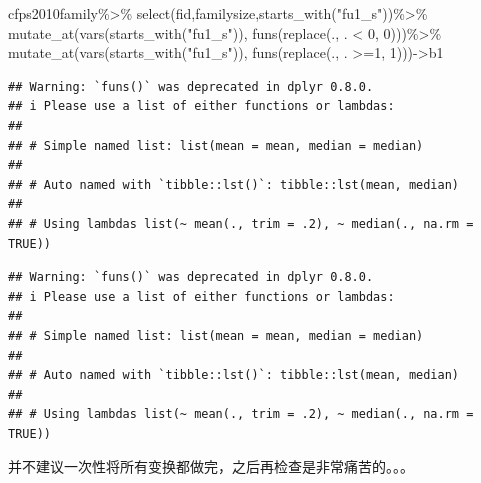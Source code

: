 \documentclass[
  oneside]{book}
\newenvironment{Shaded}{\begin{snugshade}}{\end{snugshade}}
\newcommand{\AttributeTok}[1]{\textcolor[rgb]{0.77,0.63,0.00}{#1}}
\newcommand{\CommentTok}[1]{\textcolor[rgb]{0.56,0.35,0.01}{\textit{#1}}}
\newcommand{\DecValTok}[1]{\textcolor[rgb]{0.00,0.00,0.81}{#1}}
\newcommand{\FunctionTok}[1]{\textcolor[rgb]{0.00,0.00,0.00}{#1}}
\newcommand{\NormalTok}[1]{#1}
\newcommand{\OtherTok}[1]{\textcolor[rgb]{0.56,0.35,0.01}{#1}}
\newcommand{\SpecialCharTok}[1]{\textcolor[rgb]{0.00,0.00,0.00}{#1}}
\newcommand{\StringTok}[1]{\textcolor[rgb]{0.31,0.60,0.02}{#1}}
\begin{document}
\begin{Shaded}
\begin{Highlighting}[]
\NormalTok{cfps2010family}\SpecialCharTok{\%\textgreater{}\%}
  \FunctionTok{select}\NormalTok{(fid,familysize,}\FunctionTok{starts\_with}\NormalTok{(}\StringTok{"fu1\_s"}\NormalTok{))}\SpecialCharTok{\%\textgreater{}\%}
  \FunctionTok{mutate\_at}\NormalTok{(}\FunctionTok{vars}\NormalTok{(}\FunctionTok{starts\_with}\NormalTok{(}\StringTok{"fu1\_s"}\NormalTok{)), }\FunctionTok{funs}\NormalTok{(}\FunctionTok{replace}\NormalTok{(., . }\SpecialCharTok{\textless{}} \DecValTok{0}\NormalTok{, }\DecValTok{0}\NormalTok{)))}\SpecialCharTok{\%\textgreater{}\%}
  \FunctionTok{mutate\_at}\NormalTok{(}\FunctionTok{vars}\NormalTok{(}\FunctionTok{starts\_with}\NormalTok{(}\StringTok{"fu1\_s"}\NormalTok{)), }\FunctionTok{funs}\NormalTok{(}\FunctionTok{replace}\NormalTok{(., . }\SpecialCharTok{\textgreater{}=}\DecValTok{1}\NormalTok{, }\DecValTok{1}\NormalTok{)))}\OtherTok{{-}\textgreater{}}\NormalTok{b1}
\end{Highlighting}
\end{Shaded}

\begin{verbatim}
## Warning: `funs()` was deprecated in dplyr 0.8.0.
## i Please use a list of either functions or lambdas:
## 
## # Simple named list: list(mean = mean, median = median)
## 
## # Auto named with `tibble::lst()`: tibble::lst(mean, median)
## 
## # Using lambdas list(~ mean(., trim = .2), ~ median(., na.rm = TRUE))
\end{verbatim}

\begin{verbatim}
## Warning: `funs()` was deprecated in dplyr 0.8.0.
## i Please use a list of either functions or lambdas:
## 
## # Simple named list: list(mean = mean, median = median)
## 
## # Auto named with `tibble::lst()`: tibble::lst(mean, median)
## 
## # Using lambdas list(~ mean(., trim = .2), ~ median(., na.rm = TRUE))
\end{verbatim}

并不建议一次性将所有变换都做完，之后再检查是非常痛苦的。。。

\begin{Shaded}
\end{Shaded}
\end{document}
